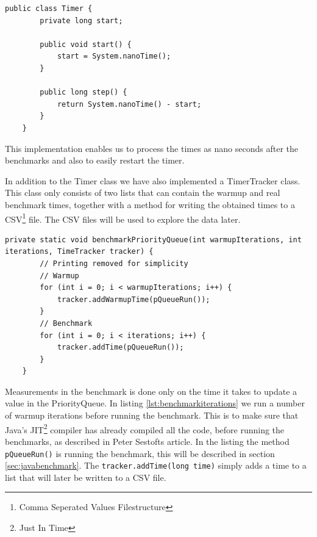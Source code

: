 \documentclass{article}
\begin{document}
\begin{lstlisting}[caption={Simple Timer class implementation},label={lst:timerclass}]
    public class Timer {
        private long start;

        public void start() {
            start = System.nanoTime();
        }

        public long step() {
            return System.nanoTime() - start;
        }
    }
\end{lstlisting}

This implementation enables us to process the times as nano seconds after 
the benchmarks and also to easily restart the timer.

In addition to the Timer class we have also implemented a TimerTracker class.
This class only consists of two lists that can contain the warmup and real 
benchmark times, together with a method for writing the obtained times to a CSV\footnote{Comma Seperated Values Filestructure} file.
The CSV files will be used to explore the data later. 

\begin{lstlisting}[caption={Benchmark iterations}, label={lst:benchmarkiterations}]
    private static void benchmarkPriorityQueue(int warmupIterations, int iterations, TimeTracker tracker) {
        // Printing removed for simplicity
        // Warmup
        for (int i = 0; i < warmupIterations; i++) {
            tracker.addWarmupTime(pQueueRun());
        }
        // Benchmark
        for (int i = 0; i < iterations; i++) {
            tracker.addTime(pQueueRun());
        }
    }
\end{lstlisting}

Measurements in the benchmark is done only on the time it takes to update 
a value in the PriorityQueue. In listing \ref{lst:benchmarkiterations} we run a number of warmup iterations before running the
benchmark. This is to make sure that Java's JIT\footnote{Just In Time} 
compiler has already compiled all the code, before running the benchmarks, as described in Peter Sestofts article\cite{microbenchmarks}. 
In the listing the method \lstinline{pQueueRun()} is running the benchmark, this will be described 
in section \ref{sec:javabenchmark}. The \lstinline{tracker.addTime(long time)} 
simply adds a time to a list that will later be written to a CSV file.

\end{document}
